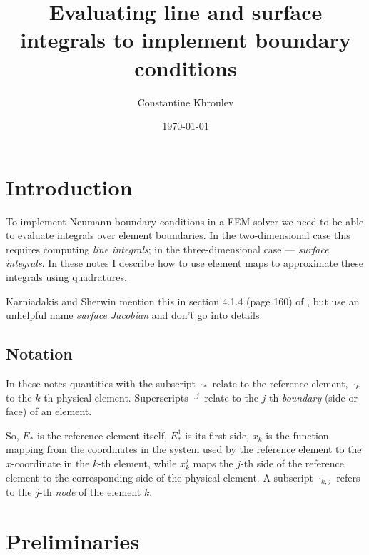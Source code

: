 \documentclass[11pt]{article}
\author{Constantine Khroulev}
\date{\today}
\title{Evaluating line and surface integrals to implement boundary conditions}
\begin{document}
\maketitle
\tableofcontents

\newcommand{\dx}{\Delta x}
\newcommand{\dy}{\Delta y}
\newcommand{\Real}{\mathbb{R}}
\newcommand{\diff}[2]{\frac{\partial #1}{\partial #2}}
\newcommand{\Diff}[2]{\frac{d #1}{d #2}}
\newcommand{\rs}{\diff{\Fk{\R}}{s}}
\newcommand{\rt}{\diff{\Fk{\R}}{t}}
\newcommand{\R}{\mathbf{r}}
\newcommand{\N}{\mathbf{n}}

\section{Introduction}
\label{sec-1}

To implement Neumann boundary conditions in a FEM solver we need to be
able to evaluate integrals over element boundaries. In the
two-dimensional case this requires computing \emph{line integrals}; in
the three-dimensional case --- \emph{surface integrals}. In these
notes I describe how to use element maps to approximate these
integrals using quadratures.

Karniadakis and Sherwin mention this in section 4.1.4 (page 160) of
\cite{KarniadakisSherwin}, but use an unhelpful name \emph{surface
  Jacobian} and don't go into details.

\subsection{Notation}
\label{sec:notation}

In these notes quantities with the subscript $\cdot_{*}$ relate to the reference
element, $\cdot_{k}$ to the $k$-th physical element. Superscripts
$\cdot^{j}$ relate to the $j$-th \emph{boundary} (side or face) of an element.

So, $E_{*}$ is the reference element itself, $E_{*}^{1}$ is its first
side, $x_{k}$ is the function mapping from the coordinates in the
system used by the reference element to the $x$-coordinate in the
$k$-th element, while $x_{k}^{j}$ maps the $j$-th side of the reference
element to the corresponding side of the physical element. A subscript
$\cdot_{k,j}$ refers to the $j$-th \emph{node} of the element $k$.

\section{Preliminaries}
\label{sec-2}
\end{document}
